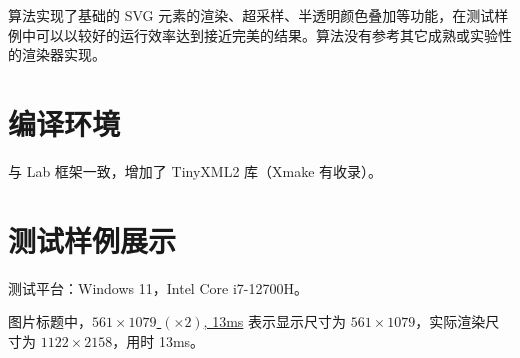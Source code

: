 \documentclass[UTF8]{ctexart}
\begin{document}
算法实现了基础的 SVG 元素的渲染、超采样、半透明颜色叠加等功能，在测试样例中可以以较好的运行效率达到接近完美的结果。算法没有参考其它成熟或实验性的渲染器实现。

\section{编译环境}

与 Lab 框架一致，增加了 TinyXML2 库（Xmake 有收录）。

\section{测试样例展示}

测试平台：Windows 11，Intel Core i7-12700H。

图片标题中，\underline{$561 \times 1079$ $(\times 2)$, 13ms} 表示显示尺寸为 $561 \times 1079$，实际渲染尺寸为 $1122 \times 2158$，用时 13ms。
\end{document}

